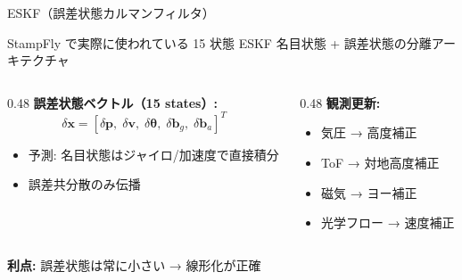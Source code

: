 \documentclass[aspectratio=169, 14pt]{beamer}
\begin{document}
\begin{frame}{ESKF（誤差状態カルマンフィルタ）}
  \begin{block}{StampFly で実際に使われている 15 状態 ESKF}
    名目状態 + 誤差状態の分離アーキテクチャ
  \end{block}

  \vspace{0.3em}

  {\small
  \begin{columns}[t]
    \begin{column}{0.48\textwidth}
      \textbf{誤差状態ベクトル（15 states）:}
      \[
        \delta\mathbf{x} = [\delta\mathbf{p},\;\delta\mathbf{v},\;\delta\boldsymbol{\theta},\;\delta\mathbf{b}_g,\;\delta\mathbf{b}_a]^T
      \]
      \begin{itemize}
        \item 予測: 名目状態はジャイロ/加速度で直接積分
        \item 誤差共分散のみ伝播
      \end{itemize}
    \end{column}
    \begin{column}{0.48\textwidth}
      \textbf{観測更新:}
      \begin{itemize}
        \item 気圧 → 高度補正
        \item ToF → 対地高度補正
        \item 磁気 → ヨー補正
        \item 光学フロー → 速度補正
      \end{itemize}
    \end{column}
  \end{columns}
  }

  \vspace{0.3em}
  {\footnotesize \textbf{利点:} 誤差状態は常に小さい → 線形化が正確}
\end{frame}
\end{document}
